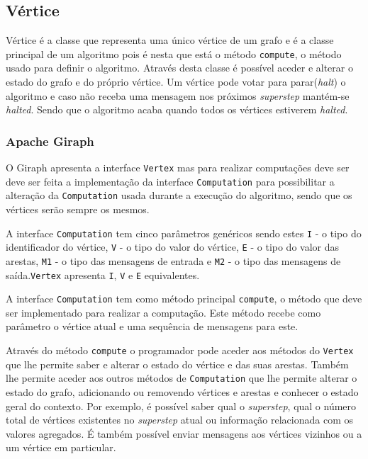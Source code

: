 \subsection{Vértice}
\label{ss:vert}
Vértice é a classe que representa uma único vértice de um grafo e é a classe principal de um algoritmo pois é nesta que está o método \texttt{compute}, o método usado para definir o algoritmo. Através desta classe é possível aceder e alterar o estado do grafo e do próprio vértice. Um vértice pode votar para parar(\textit{halt}) o algoritmo e caso não receba uma mensagem nos próximos \textit{superstep} mantém-se \textit{halted}. Sendo que o algoritmo acaba quando todos os vértices estiverem \textit{halted}.
\subsubsection*{Apache Giraph}


O Giraph apresenta a interface \texttt{Vertex} mas para realizar computações deve ser deve ser feita a implementação da interface \texttt{Computation} para possibilitar a alteração da \texttt{Computation} usada durante a execução do algoritmo, sendo que os vértices serão sempre os mesmos.

A interface \texttt{Computation} tem cinco parâmetros genéricos sendo estes \texttt{I} - o tipo do identificador do vértice, \texttt{V} - o tipo do valor do vértice, \texttt{E} - o tipo do valor das arestas, \texttt{M1} - o tipo das mensagens de entrada e \texttt{M2} - o tipo das mensagens de saída.\texttt{Vertex} apresenta \texttt{I}, \texttt{V} e \texttt{E} equivalentes.

A interface \texttt{Computation} tem como método principal \texttt{compute}, o método que deve ser implementado para realizar a computação. Este método recebe como parâmetro o vértice atual e uma sequência de mensagens para este.

Através do método \texttt{compute} o programador pode aceder aos métodos do \texttt{Vertex} que lhe permite saber e alterar o estado do vértice e das suas arestas. Também lhe permite aceder aos outros métodos de \texttt{Computation} que lhe permite alterar o estado do grafo, adicionando ou removendo vértices e arestas e conhecer o estado geral do contexto. Por exemplo, é possível saber qual o \textit{superstep}, qual o número total de vértices existentes no \textit{superstep} atual ou informação relacionada com os valores agregados. É também possível enviar mensagens aos vértices vizinhos ou a um vértice em particular.

